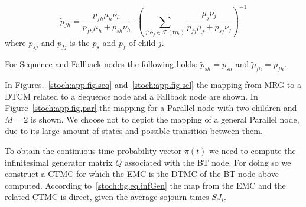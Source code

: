 \begin{equation}
\tilde p_{fh} = \frac{p_{fh} \mu_h \nu_h}{p_{fh} \mu_h + p_{sh}\nu_h} \cdot \left( \sum_{j: \mathbf{e}_j \in \mathcal{F}(\mathbf{m}_i)} \frac{\mu_j \nu_j}{p_{fj} \mu_j + p_{sj}\nu_j} \right)^{-1}
\end{equation} 
where $p_{sj}$ and $p_{fj}$ is the $p_{s}$ and $p_{f}$ of child $j$.

\begin{remark}
For Sequence and Fallback nodes the following holds: $\tilde p_{sh}=p_{sh}$ and $\tilde p_{fh}=p_{fh}$.
\end{remark}
In Figures.~\ref{stoch:app.fig.seq} and~\ref{stoch:app.fig.sel} the mapping from MRG to a DTCM related to a Sequence node and a Fallback node are shown. In Figure~\ref{stoch:app.fig.par} the mapping for a Parallel node with two children and $M=2$ is shown. We choose not to depict the mapping of a general Parallel node, due to its large amount of states and possible transition between them.

To obtain the continuous time probability vector $\pi(t)$ we need to compute the infinitesimal generator matrix $Q$ associated with the BT node. For doing so we construct a CTMC for which the EMC is the DTMC of the BT node above computed. According to~\eqref{stoch:bg.eq.infGen} the map from the EMC and the related CTMC is direct, given the average sojourn times $SJ_i$. 
